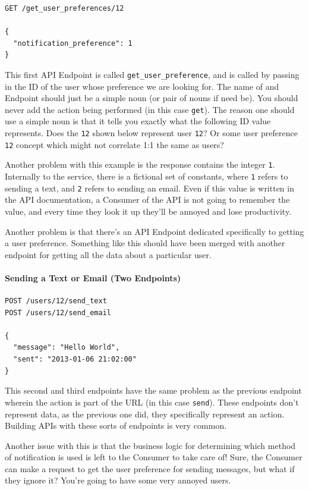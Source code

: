 \documentclass{book}
\begin{document}
\begin{verbatim}
GET /get_user_preferences/12

{
  "notification_preference": 1
}
\end{verbatim}

This first API Endpoint is called \texttt{get\_user\_preference}, and is called by passing in the ID of the user whose preference we are looking for. The name of and Endpoint should just be a simple noun (or pair of nouns if need be). You should never add the action being performed (in this case \texttt{get}). The reason one should use a simple noun is that it tells you exactly what the following ID value represents. Does the \texttt{12} shown below represent user \texttt{12}? Or some user preference \texttt{12} concept which might not correlate 1:1 the same as users?

Another problem with this example is the response contains the integer \texttt{1}. Internally to the service, there is a fictional set of constants, where \texttt{1} refers to sending a text, and \texttt{2} refers to sending an email. Even if this value is written in the API documentation, a Consumer of the API is not going to remember the value, and every time they look it up they'll be annoyed and lose productivity.

Another problem is that there's an API Endpoint dedicated specifically to getting a user preference. Something like this should have been merged with another endpoint for getting all the data about a particular user.

\paragraph{\textbf{Sending a Text or Email (Two Endpoints)}}

\begin{verbatim}
POST /users/12/send_text
POST /users/12/send_email

{
  "message": "Hello World",
  "sent": "2013-01-06 21:02:00"
}
\end{verbatim}

This second and third endpoints have the same problem as the previous endpoint wherein the action is part of the URL (in this case \texttt{send}). These endpoints don't represent data, as the previous one did, they specifically represent an action. Building APIs with these sorts of endpoints is very common.

Another issue with this is that the business logic for determining which method of notification is used is left to the Consumer to take care of! Sure, the Consumer can make a request to get the user preference for sending messages, but what if they ignore it? You're going to have some very annoyed users.
\end{document}

